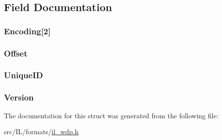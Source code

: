 \subsection{Field Documentation}
\hypertarget{struct_w_d_p_h_e_a_d_a9eddc985dcc65c530caea1476a9073e5}{
\subsubsection[{Encoding}]{ Encoding\mbox{[}2\mbox{]}}}\label{struct_w_d_p_h_e_a_d_a9eddc985dcc65c530caea1476a9073e5}
\hypertarget{struct_w_d_p_h_e_a_d_a3b5617e246c8182c704c5369dec7f049}{
\subsubsection[{Offset}]{ Offset}}\label{struct_w_d_p_h_e_a_d_a3b5617e246c8182c704c5369dec7f049}
\hypertarget{struct_w_d_p_h_e_a_d_ab1d7718bfc51d3608cb4af5ab2ebb785}{
\subsubsection[{Unique\-I\-D}]{ Unique\-I\-D}}\label{struct_w_d_p_h_e_a_d_ab1d7718bfc51d3608cb4af5ab2ebb785}
\hypertarget{struct_w_d_p_h_e_a_d_adec36323c202074e86c4b4bbe1b0fca3}{
\subsubsection[{Version}]{ Version}}\label{struct_w_d_p_h_e_a_d_adec36323c202074e86c4b4bbe1b0fca3}


The documentation for this struct was generated from the following file\-:\begin{DoxyCompactItemize}
\item 
src/\-I\-L/formats/\hyperlink{il__wdp_8h}{il\-\_\-wdp.\-h}\end{DoxyCompactItemize}
